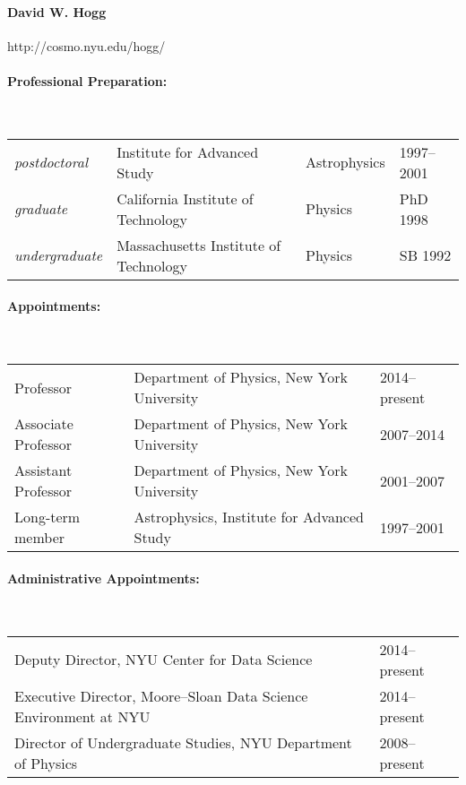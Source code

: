 \documentclass[letterpaper,12pt]{article}
\begin{document}
\paragraph{David W. Hogg} http://cosmo.nyu.edu/hogg/

\paragraph{Professional Preparation:}~\\[3pt]
\begin{tabular}{llll}
\textsl{postdoctoral}
  & Institute for Advanced Study          & Astrophysics & 1997--2001\\
\textsl{graduate}
  & California Institute of Technology    & Physics & PhD 1998\\
\textsl{undergraduate}
  & Massachusetts Institute of Technology & Physics & SB 1992\\
\end{tabular}
           
\paragraph{Appointments:}~\\[3pt]
\begin{tabular}{lll}
Professor           & Department of Physics, New York University & 2014--present \\
Associate Professor & Department of Physics, New York University & 2007--2014 \\
Assistant Professor & Department of Physics, New York University & 2001--2007 \\
Long-term member    & Astrophysics, Institute for Advanced Study & 1997--2001 \\
\end{tabular}

\paragraph{Administrative Appointments:}~\\[3pt]
\begin{tabular}{ll}
Deputy Director, NYU Center for Data Science & 2014--present \\
Executive Director, Moore--Sloan Data Science Environment at NYU & 2014--present \\
Director of Undergraduate Studies, NYU Department of Physics & 2008--present \\
\end{tabular}
\end{document}
